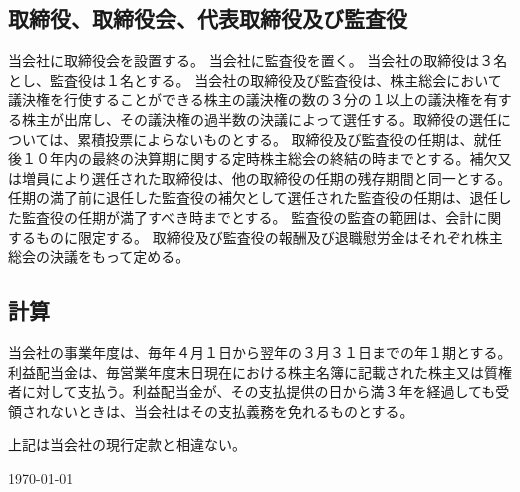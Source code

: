 \documentclass[10pt,a4paper,uplatex]{jsarticle}
\begin{document}
\subsection{取締役、取締役会、代表取締役及び監査役}
当会社に取締役会を設置する。
当会社に監査役を置く。
当会社の取締役は３名とし、監査役は１名とする。
当会社の取締役及び監査役は、株主総会において議決権を行使することができる株主の議決権の数の３分の１以上の議決権を有する株主が出席し、その議決権の過半数の決議によって選任する。取締役の選任については、累積投票によらないものとする。
取締役及び監査役の任期は、就任後１０年内の最終の決算期に関する定時株主総会の終結の時までとする。補欠又は増員により選任された取締役は、他の取締役の任期の残存期間と同一とする。任期の満了前に退任した監査役の補欠として選任された監査役の任期は、退任した監査役の任期が満了すべき時までとする。
監査役の監査の範囲は、会計に関するものに限定する。 
取締役及び監査役の報酬及び退職慰労金はそれぞれ株主総会の決議をもって定める。


\subsection{計算}
当会社の事業年度は、毎年４月１日から翌年の３月３１日までの年１期とする。
利益配当金は、毎営業年度末日現在における株主名簿に記載された株主又は質権者に対して支払う。利益配当金が、その支払提供の日から満３年を経過しても受領されないときは、当会社はその支払義務を免れるものとする。


\vspace{20pt}
上記は当会社の現行定款と相違ない。
\begin{flushleft} 
\today\\
\vspace{10pt}
\MakeSignatureField
\end{flushleft}
\end{document}
